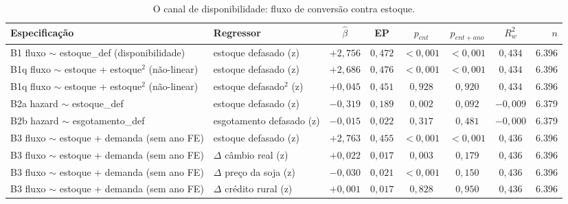 \begin{table}[!ht]
\centering
\caption[Canal de disponibilidade]{O canal de disponibilidade: fluxo de conversão contra estoque.}
\label{tab:disponibilidade}
\footnotesize
\begin{tabular}{p{3.7cm}p{2.4cm}cccccr}
\toprule
\textbf{Especificação} & \textbf{Regressor} & \textbf{$\hat{\beta}$} & \textbf{EP} & \textbf{$p_{ent}$} & \textbf{$p_{ent+ano}$} & \textbf{$R^2_w$} & \textbf{$n$} \\
\midrule
B1  fluxo $\sim$ estoque\_def (disponibilidade) & estoque defasado (z) & $+2{,}756$ & $0{,}472$ & $<0{,}001$ & $<0{,}001$ & $0{,}434$ & 6.396 \\
B1q fluxo $\sim$ estoque + estoque$^2$ (não-linear) & estoque defasado (z) & $+2{,}686$ & $0{,}476$ & $<0{,}001$ & $<0{,}001$ & $0{,}434$ & 6.396 \\
B1q fluxo $\sim$ estoque + estoque$^2$ (não-linear) & estoque defasado$^2$ (z) & $+0{,}045$ & $0{,}451$ & $0{,}928$ & $0{,}920$ & $0{,}434$ & 6.396 \\
B2a hazard $\sim$ estoque\_def & estoque defasado (z) & $-0{,}319$ & $0{,}189$ & $0{,}002$ & $0{,}092$ & $-0{,}009$ & 6.379 \\
B2b hazard $\sim$ esgotamento\_def & esgotamento defasado (z) & $-0{,}015$ & $0{,}022$ & $0{,}317$ & $0{,}481$ & $-0{,}000$ & 6.379 \\
B3  fluxo $\sim$ estoque + demanda (sem ano FE) & estoque defasado (z) & $+2{,}763$ & $0{,}455$ & $<0{,}001$ & $<0{,}001$ & $0{,}436$ & 6.396 \\
B3  fluxo $\sim$ estoque + demanda (sem ano FE) & $\Delta$ câmbio real (z) & $+0{,}022$ & $0{,}017$ & $0{,}003$ & $0{,}179$ & $0{,}436$ & 6.396 \\
B3  fluxo $\sim$ estoque + demanda (sem ano FE) & $\Delta$ preço da soja (z) & $-0{,}030$ & $0{,}021$ & $<0{,}001$ & $0{,}150$ & $0{,}436$ & 6.396 \\
B3  fluxo $\sim$ estoque + demanda (sem ano FE) & $\Delta$ crédito rural (z) & $+0{,}001$ & $0{,}017$ & $0{,}828$ & $0{,}950$ & $0{,}436$ & 6.396 \\
\bottomrule
\end{tabular}

\end{table}
